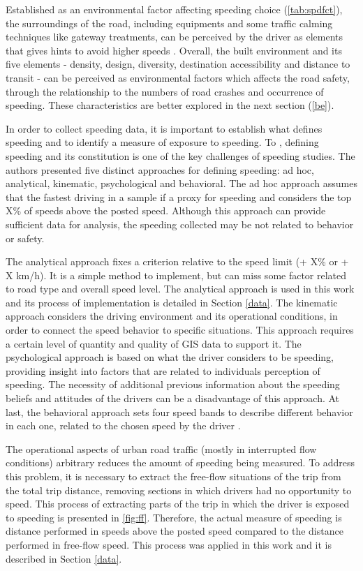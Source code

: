 Established as an environmental factor affecting speeding choice (\autoref{tab:spdfct}), the surroundings of the road, including equipments and some traffic calming techniques like gateway treatments, can be perceived by the driver as elements that gives hints to avoid higher speeds \cite{WHO2008}. Overall, the built environment and its five elements - density, design, diversity, destination accessibility and distance to transit - can be perceived as environmental factors which affects the road safety, through the relationship to the numbers of road crashes and occurrence of speeding. These characteristics are better explored in the next section (\ref{be}). 

In order to collect speeding data, it is important to establish what defines speeding and to identify a measure of exposure to speeding. To \textcite{Richard2013}, defining speeding and its constitution is one of the key challenges of speeding studies. The authors presented five distinct approaches for defining speeding: ad hoc, analytical, kinematic, psychological and behavioral. The ad hoc approach assumes that the fastest driving in a sample if a proxy for speeding and considers the top X\% of speeds above the posted speed. Although this approach can provide sufficient data for analysis, the speeding collected may be not related to behavior or safety. 

The analytical approach fixes a criterion relative to the speed limit (+ X\% or + X km/h). It is a simple method to implement, but can miss some factor related to road type and overall speed level. The analytical approach is used in this work and its process of implementation is detailed in Section \ref{data}. The kinematic approach considers the driving environment and its operational conditions, in order to connect the speed behavior to specific situations. This approach requires a certain level of quantity and quality of GIS data to support it. The psychological approach is based on what the driver considers to be speeding, providing insight into factors that are related to individuals perception of speeding. The necessity of additional previous information about the speeding beliefs and attitudes of the drivers can be a disadvantage of this approach. At last, the behavioral approach sets four speed bands to describe different behavior in each one, related to the chosen speed by the driver \cite{Richard2013}.

The operational aspects of urban road traffic (mostly in interrupted flow conditions) arbitrary reduces the amount of speeding being measured. To address this problem, it is necessary to extract the free-flow situations of the trip from the total trip distance, removing sections in which drivers had no opportunity to speed. This process of extracting parts of the trip in which the driver is exposed to speeding is presented in \autoref{fig:ff}. Therefore, the actual measure of speeding is distance performed in speeds above the posted speed compared to the distance performed in free-flow speed. This process was applied in this work and it is described in Section \ref{data}. 

